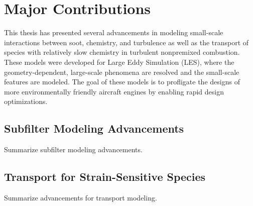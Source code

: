\section{Major Contributions}
\label{sec:conclusion:contributions}

This thesis has presented several advancements in modeling small-scale interactions between soot, chemistry, and turbulence as well as the transport of species with relatively slow chemistry in turbulent nonpremixed combustion. These models were developed for Large Eddy Simulation (LES), where the geometry-dependent, large-scale phenomena are resolved and the small-scale features are modeled. The goal of these models is to profligate the designs of more environmentally friendly aircraft engines by enabling rapid design optimizations.


\subsection{Subfilter Modeling Advancements}
\label{sec:conclusion:contributions:subfilter}

Summarize subfilter modeling advancements.


\subsection{Transport for Strain-Sensitive Species}
\label{sec:conclusion:contributions:transport}

Summarize advancements for transport modeling.
